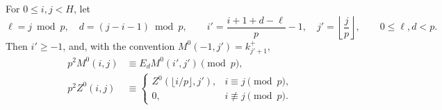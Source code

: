 \begin{lemma}\label{lem:odd-digit-reductions}
For $0\le i,j<H$, let
\[
 \ell=j\bmod p,\quad d=(j-i-1)\bmod p,
 \qquad
 i'=\frac{i+1+d-\ell}{p}-1,\quad j'=\left\lfloor\frac jp\right\rfloor,
 \qquad 0\le\ell,d<p.
\]
Then $i'\ge-1$, and, with the convention
$M^0(-1,j')=k^+_{j'+1}$,
\begin{equation}\label{eq:digit-layers}
 \begin{split}
 p^2M^0(i,j)&\equiv E_dM^0(i',j')\pmod p,\\
 p^2Z^0(i,j)&\equiv
 \begin{cases}
 Z^0(\lfloor i/p\rfloor,j'),&i\equiv j\pmod p,\\
 0,&i\not\equiv j\pmod p.
 \end{cases}
 \end{split}
\end{equation}
\end{lemma}

